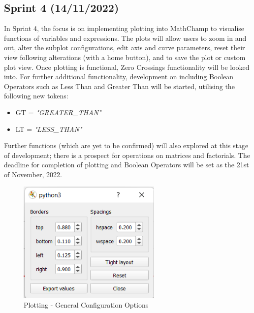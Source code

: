\documentclass[a4paper, oneside, 11pt]{report}
\begin{document}
\subsection{Sprint 4 (14/11/2022)}
In Sprint 4, the focus is on implementing plotting into MathChamp to visualise functions of variables and expressions. The plots will allow users to zoom in and out, alter the subplot configurations, edit axis and curve parameters, reset their view following alterations (with a home button), and to save the plot or custom plot view. Once plotting is functional, Zero Crossings functionality will be looked into. For further additional functionality, development on including Boolean Operators such as Less Than and Greater Than will be started, utilising the following new tokens:

\begin{itemize}
    \item GT = \textit{"GREATER\_THAN"}
    \item LT = \textit{"LESS\_THAN"}
\end{itemize}

Further functions (which are yet to be confirmed) will also explored at this stage of development; there is a prospect for operations on matrices and factorials. The deadline for completion of plotting and Boolean Operators will be set as the 21st of November, 2022.

\begin{figure}[h]
    \centering
    \includegraphics[width=7.0cm]{plottingSubPlots.png}
    \caption{Plotting - General Configuration Options}
    \label{fig:bnf}
\end{figure}
\end{document}
